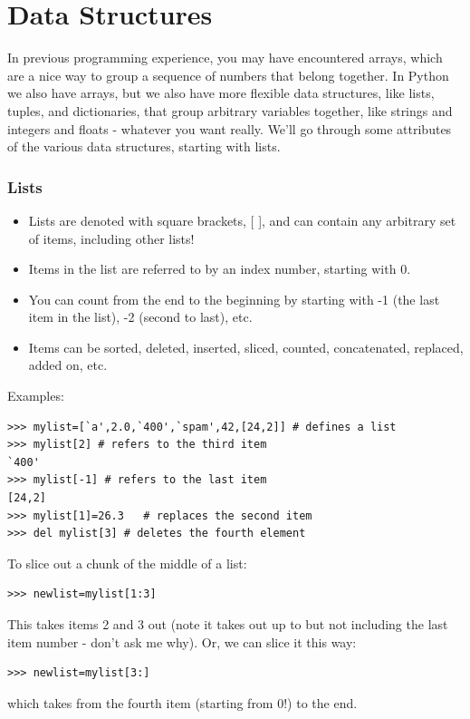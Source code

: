 \documentclass[11pt]{book}
\begin{document}
{{\section{Data Structures}

In previous programming experience, you may have encountered arrays, which are a nice way to group a sequence of numbers that belong together.  In Python  we also have arrays, but we also have more flexible data structures, like lists, tuples, and dictionaries,  that group arbitrary variables together, like strings and integers and floats - whatever you want really. We'll go through some attributes of the various data structures, starting with lists.

\subsubsection{Lists}
\begin{itemize}
\item Lists are denoted with square brackets,  [ ],  and can contain any arbitrary set of items, including other lists!
\item Items in the list are referred to by an index number, starting with 0.  
\item You can  count from the end to the beginning by starting with -1 (the last item in the list), -2 (second to last), etc. 
\item Items can be sorted, deleted, inserted, sliced, counted, concatenated, replaced, added on, etc.
\end{itemize}
\noindent
Examples:

{ \color{blue} \begin{verbatim}
>>> mylist=[`a',2.0,`400',`spam',42,[24,2]] # defines a list
>>> mylist[2] # refers to the third item
`400'
>>> mylist[-1] # refers to the last item
[24,2]
>>> mylist[1]=26.3   # replaces the second item
>>> del mylist[3] # deletes the fourth element 
\end{verbatim}}


\noindent
To slice out a chunk of the middle of a list:
{ \color{blue} \begin{verbatim}
>>> newlist=mylist[1:3]
\end{verbatim}}
\noindent
This takes items 2 and 3 out (note it takes out up to but not including the last item number - don't ask me why).  
Or, we can slice it this way:
{ \color{blue} \begin{verbatim}
>>> newlist=mylist[3:] 
\end{verbatim}}
\noindent
which takes from the fourth item (starting from 0!) to the end. 


}}
\end{document}

